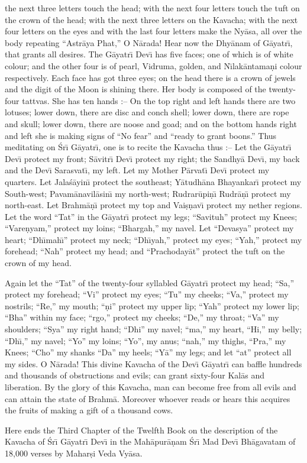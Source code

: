 the next three letters touch the head; with the next four letters touch the tuft on the crown of the head; with the next three letters on the Kavacha; with the next four letters on the eyes and with the last four letters make the Ny\=asa, all over the body repeating ``Astr\=aya Phat,'' O N\=arada! Hear now the Dhy\=anam of G\=ayatr\={\i}, that grants all desires. The G\=ayatr\={\i} Dev\={\i} has five faces; one of which is of white colour; and the other four is of pearl, Vidruma, golden, and N\={\i}lak\=antama\d{n}i colour respectively. Each face has got three eyes; on the head there is a crown of jewels and the digit of the Moon is shining there. Her body is composed of the twenty-four tattvas. She has ten hands :-- On the top right and left hands there are two lotuses; lower down, there are disc and conch shell; lower down, there are rope and skull; lower down, there are noose and goad; and on the bottom hands right and left she is making signs of ``No fear'' and ``ready to grant boons.'' Thus meditating on \'Sr\={\i} G\=ayatr\={\i}, one is to recite the Kavacha thus :-- Let the G\=ayatr\={\i} Dev\={\i} protect my front; S\=avitr\={\i} Dev\={\i} protect my right; the Sandhy\=a Dev\={\i}, my back and the Dev\={\i} Sarasvat\={\i}, my left. Let my Mother P\=arvat\={\i} Dev\={\i} protect my quarters. Let Jala\'s\=ayin\={\i} protect the southeast; Y\=atudh\=ana Bhayankar\={\i} protect my South-west; Pavam\=anavil\=asin\={\i} my north-west; Rudrar\=upi\d{n}\={\i} Rudr\=a\d{n}\={\i} protect my north-east. Let Brahm\=a\d{n}\={\i} protect my top and Vai\d{s}\d{n}av\={\i} protect my nether regions. Let the word ``Tat'' in the G\=ayatr\={\i} protect my legs; ``Savituh'' protect my Knees; ``Vare\d{n}yam,'' protect my loins; ``Bhargah,'' my navel. Let ``Devasya'' protect my heart; ``Dh\={\i}mah\={\i}'' protect my neck; ``Dh\={\i}yah,'' protect my eyes; ``Yah,'' protect my forehead; ``Nah'' protect my head; and ``Prachoday\=at'' protect the tuft on the crown of my head.

Again let the ``Tat'' of the twenty-four syllabled G\=ayatr\={\i} protect my head; ``Sa,'' protect my forehead; ``Vi'' protect my eyes; ``Tu'' my cheeks; ``Va,'' protect my nostrils; ``Re,'' my mouth; ``\d{n}i'' protect my upper lip; ``Yah'' protect my lower lip; ``Bha'' within my face; ``rgo,'' protect my cheeks; ``De,'' my throat; ``Va'' my shoulders; ``Sya'' my right hand; ``Dhi'' my navel; ``ma,'' my heart, ``Hi,'' my belly; ``Dh\={\i},'' my navel; ``Yo'' my loins; ``Yo'', my anus; ``nah,'' my thighs, ``Pra,'' my Knees; ``Cho'' my shanks ``Da'' my heels; ``Y\=a'' my legs; and let ``at'' protect all my sides. O N\=arada! This divine Kavacha of the Dev\={\i} G\=ayatr\={\i} can baffle hundreds and thousands of obstructions and evils; can grant sixty-four Kal\=as and liberation. By the glory of this Kavacha, man can become free from all evils and can attain the state of Brahm\=a. Moreover whoever reads or hears this acquires the fruits of making a gift of a thousand cows.

Here ends the Third Chapter of the Twelfth Book on the description of the Kavacha of \'Sr\={\i} G\=ayatr\={\i} Dev\={\i} in the Mah\=apur\=a\d{n}am \'Sr\={\i} Mad Dev\={\i} Bh\=agavatam of 18,000 verses by Mahar\d{s}i Veda Vy\=asa.



